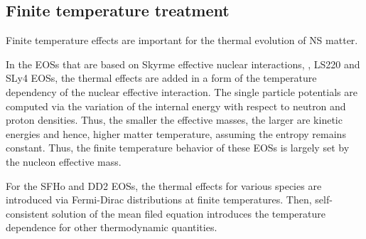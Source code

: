 \subsection{Finite temperature treatment}

Finite temperature effects are important for the thermal evolution of \ac{NS} matter.



In the \acp{EOS} that are based on Skyrme effective nuclear interactions, 
\eg, LS220 and SLy4 \acp{EOS}, the thermal effects are added 
in a form of the temperature dependency of the nuclear effective interaction. %
%
The single particle potentials are computed via the variation of the internal 
energy with respect to neutron and proton densities. Thus, the smaller the effective 
masses, the larger are kinetic energies and hence, higher matter temperature, assuming 
the entropy remains constant.
%
Thus, the finite temperature behavior of these \acp{EOS} is largely set by the nucleon effective mass. 

%
For the SFHo and DD2 \acp{EOS}, 
the thermal effects for various species are introduced via Fermi-Dirac distributions at finite temperatures.
Then, self-consistent solution of the mean filed equation introduces the temperature dependence for other 
thermodynamic quantities.%

